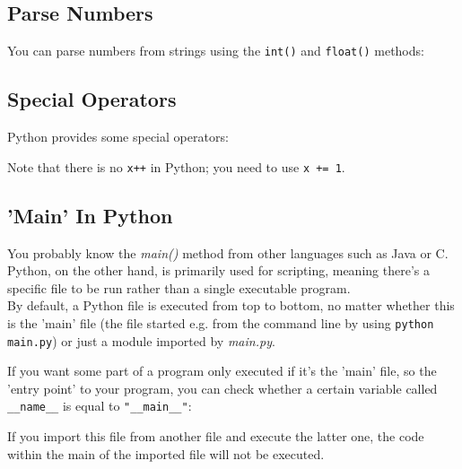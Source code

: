     \subsection{Parse Numbers}
        You can parse numbers from strings using the
        \texttt{int()} and \texttt{float()} methods:


    \subsection{Special Operators}
        Python provides some special operators:


        Note that there is no \texttt{x++} in Python; you need to use
        \texttt{x += 1}.

    \subsection{'Main' In Python}
        You probably know the \textit{main()} method from other languages such as Java or C. \\
        Python, on the other hand, is primarily used for scripting, meaning there's a specific file
        to be run rather than a single executable program. \\
        By default, a Python file is executed from top to bottom, no matter whether this is the
        'main' file (the file started e.g. from the command line by using
        \texttt{python main.py}) or just a module imported by \textit{main.py}.

        If you want some part of a program only executed if it's the 'main' file, so the
        'entry point' to your program, you can check whether a certain variable called
        \texttt{__name__} is equal to \texttt{"__main__"}:


        If you import this file from another file and execute the latter one, the code within the
        main of the imported file will not be executed.


